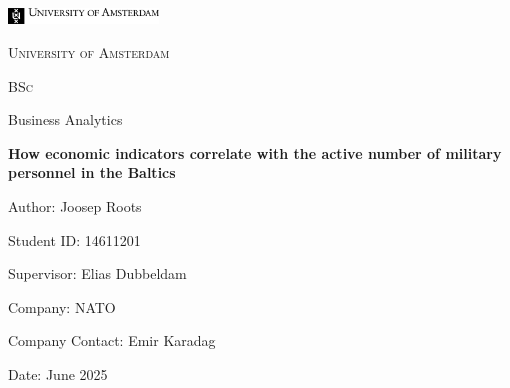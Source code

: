 \documentclass[12pt]{report}
\begin{document}
\begin{titlepage}
    \centering
    \vspace*{1cm}

    \includegraphics[width=0.3\textwidth]{images/uva_logo.jpg}\par\vspace{1cm}

    {\scshape\LARGE University of Amsterdam \par}
    \vspace{0.5cm}
    {\scshape\Large BSc \par}
    {\Large Business Analytics \par}
    \vspace{2cm}

    {\Huge\bfseries How economic indicators correlate with the active number of military personnel in the Baltics\par}
    \vspace{1.5cm}

    {\Large Author: Joosep Roots \par}
    {\Large Student ID: 14611201 \par}
    \vspace{1cm}

    {\Large Supervisor: Elias Dubbeldam \par}
    \vspace{1cm}

    {\Large Company: NATO \par}
    {\Large Company Contact: Emir Karadag \par}
    \vspace{1.5cm}

    {\Large Date: June 2025 \par}
    \vfill

\end{titlepage}
\end{document}
